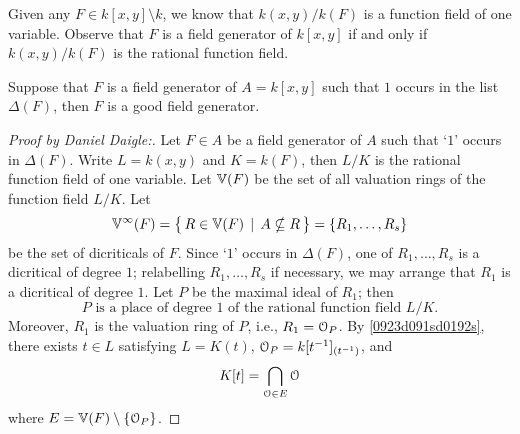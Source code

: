 \begin{remark}
Given any $F \in  k[x,y] \setminus  k$, we know that
$ k(x,y) /  k(F)$ is a function field
of one variable. Observe that $F$ is a field generator 
of $ k[x,y]$ if and only if 
$ k(x,y) /  k(F)$ is the rational function field.
\end{remark}

\begin{proposition}
Suppose that $F$ is a field generator of $A= k[x,y]$ 
such that $1$ occurs in the list $\Delta(F)$, then $F$ is a 
good field generator.
\end{proposition}

\begin{proof}[Proof by Daniel Daigle:]
Let $F \in A$ be a field generator of $A$ such that 
`$1$' occurs in $\Delta(F)$.
Write $L =  k(x,y)$ and $K =  k(F)$, then $L/K$ is the 
rational function field of one variable.
Let $\mathbb{V}(F)$ be the set of all valuation rings of the 
function field $L/K$.
Let 
$$
\mathbb{V}^\infty(F) = \big\{\, R \in \mathbb{V}(F) \, \mid \, A \nsubseteq R \, \big\} = \{ R_1, \dots, R_s \}
$$
be the set of dicriticals of $F$. Since `$1$' occurs in
$\Delta(F)$, one of $R_1, \dots, R_s$
is a dicritical of degree $1$; relabelling  $R_1, \dots, R_s$ 
if necessary, we may arrange that
$R_1$ is a dicritical of degree $1$. Let  $P$ be the maximal 
ideal of $R_1$; then
$$
\text{$P$ is a place of degree $1$ of the rational function field $L/K$.}
$$
Moreover, $R_1$ is the valuation ring of $P$, i.e., $R_1 = \EuScript{O}_P$.
By \ref{0923d091sd0192s}, there exists $t \in L$ satisfying
$L = K(t)$, $\EuScript{O}_P =  k[ t^{-1} ]_{(t^{-1})}$, and
\begin{equation} \label {uqid7623erih9we8}
K[t] = \bigcap_{\EuScript{O} \in E} \EuScript{O}
\end{equation}
where $E = \mathbb{V}(F) \setminus \{ \EuScript{O}_P \}$.


\end{proof}
